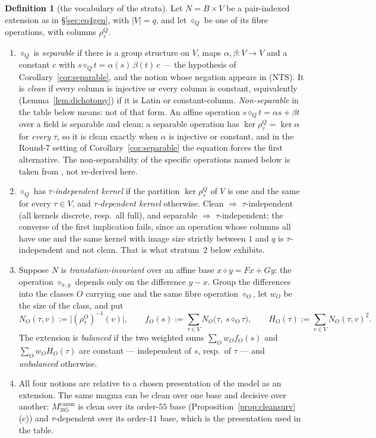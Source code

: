 \documentclass[11pt]{article}
\theoremstyle{plain}
\theoremstyle{definition}
\newtheorem{definition}[theorem]{Definition}
\theoremstyle{remark}
\numberwithin{equation}{section}
\begin{document}
\begin{definition}[the vocabulary of the strata]\label{def:strata}
Let $N = B\times V$ be a pair-indexed extension as in \S\ref{sec:eq4gen}, with
$|V| = q$, and let $\diamond_Q$ be one of its fibre operations, with columns
$\rho^Q_\tau$.
\begin{enumerate}
\item[(i)] $\diamond_Q$ is \emph{separable} if there is a group structure on $V$,
maps $\alpha,\beta : V\to V$ and a constant $c$ with
$s\diamond_Qt = \alpha(s)\,\beta(t)\,c$ --- the hypothesis of
Corollary~\ref{cor:separable}, and the notion whose negation appears in (NTS).
It is \emph{clean} if every column is injective or every column is constant,
equivalently (Lemma~\ref{lem:dichotomy}) if it is Latin or constant-column.
\emph{Non-separable} in the table below means: not of that form. An affine
operation $s\diamond_Qt = \alpha s+\beta t$ over a field is separable and clean;
a separable operation has $\ker\rho^Q_\tau = \ker\alpha$ for \emph{every} $\tau$,
so it is clean exactly when $\alpha$ is injective or constant, and in the
Round-7 setting of Corollary~\ref{cor:separable} the equation forces the first
alternative. The non-separability of the specific operations named below is
taken from \cite{R9A}, not re-derived here.
\item[(ii)] $\diamond_Q$ has \emph{$\tau$-independent kernel} if the partition
$\ker\rho^Q_\tau$ of $V$ is one and the same for every $\tau\in V$, and
\emph{$\tau$-dependent kernel} otherwise. Clean $\Rightarrow$ $\tau$-independent
(all kernels discrete, resp.\ all full), and separable $\Rightarrow$
$\tau$-independent; the converse of the first implication fails, since an
operation whose columns all have one and the same kernel with image size
strictly between $1$ and $q$ is $\tau$-independent and not clean. That is what
stratum~2 below exhibits.
\item[(iii)] Suppose $N$ is \emph{translation-invariant} over an affine base
$x\diamond y = Fx+Gy$: the operation $\diamond_{x,y}$ depends only on the
difference $y-x$. Group the differences into the classes $O$ carrying one and
the same fibre operation $\diamond_O$, let $w_O$ be the size of the class, and
put
\[
  N_O(\tau,v) := \bigl|(\rho^O_\tau)^{-1}(v)\bigr| ,\qquad
  f_O(s) := \sum_{\tau\in V}N_O\bigl(\tau,\ s\diamond_O\tau\bigr) ,\qquad
  H_O(\tau) := \sum_{v\in V}N_O(\tau,v)^2 .
\]
The extension is \emph{balanced} if the two weighted sums
$\sum_Ow_Of_O(s)$ and $\sum_Ow_OH_O(\tau)$ are constant --- independent of $s$,
resp.\ of $\tau$ --- and \emph{unbalanced} otherwise.
\item[(iv)] All four notions are relative to a chosen presentation of the model
as an extension. The same magma can be clean over one base and decisive over
another: $M_{385}^{\mathrm{canon}}$ is clean over its order-$55$ base
(Proposition~\ref{prop:cleansurv}(c)) and $\tau$-dependent over its order-$11$
base, which is the presentation used in the table.
\end{enumerate}
\end{definition}
\end{document}
